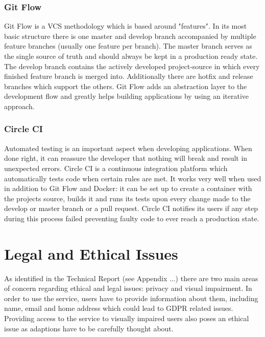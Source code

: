 \subsubsection{Git Flow}
Git Flow is a VCS methodology which is based around "features". In its most basic structure there is one master and develop branch accompanied by multiple feature branches (usually one feature per branch). The master branch serves as the single source of truth and should always be kept in a production ready state. The develop branch contains the actively developed project-source in which every finished feature branch is merged into. Additionally there are hotfix and release branches which support the others. Git Flow adds an abstraction layer to the development flow and greatly helps building applications by using an iterative approach.

\subsubsection{Circle CI}
Automated testing is an important aspect when developing applications. When done right, it can reassure the developer that nothing will break and result in unexpected errors. Circle CI is a continuous integration platform which automatically tests code when certain rules are met. It works very well when used in addition to Git Flow and Docker: it can be set up to create a container with the projects source, builds it and runs its tests upon every change made to the develop or master branch or a pull request. Circle CI notifies its users if any step during this process failed preventing faulty code to ever reach a production state.

\section{Legal and Ethical Issues}
As identified in the Technical Report (see Appendix ...) there are two main areas of concern regarding ethical and legal issues: privacy and visual impairment. In order to use the service, users have to provide information about them, including name, email and home address which could lead to GDPR related issues. Providing access to the service to visually impaired users also poses an ethical issue as adaptions have to be carefully thought about.